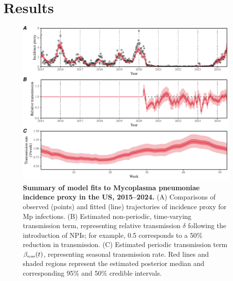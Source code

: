 \documentclass[12pt]{article}
\newcommand{\tsub}[2]{#1_{{\textrm{\tiny #2}}}}
\begin{document}
\section{Results}

\begin{figure}[!ht]
\includegraphics[width=\textwidth]{../figure1/figure1_new.pdf}
\caption{
\textbf{Summary of model fits to Mycoplasma pneumoniae incidence proxy in the US, 2015--2024.}
(A) Comparisons of observed (points) and fitted (line) trajectories of incidence proxy for Mp infections.
(B) Estimated non-periodic, time-varying transmission term, representing relative transmission $\delta$ following the introduction of NPIs; 
for example, 0.5 corresponds to a 50\% reduction in transmission.
(C) Estimated periodic transmission term  $\tsub{\beta}{seas}(t)$, representing seasonal transmission rate.
Red lines and shaded regions represent the estimated posterior median and corresponding 95\% and 50\% credible intervals.
}
\end{figure}
\end{document}
